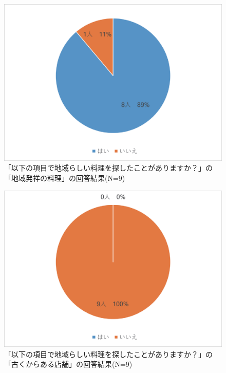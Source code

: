 \documentclass{funthesis}
\begin{document}
\begin{figure}[tbp]
  \begin{center}
    \includegraphics[clip,width=12cm]{5.4.eps}
    \caption[「以下の項目で地域らしい料理を探したことがありますか？」の「地域発祥の料理」の回答結果]{「以下の項目で地域らしい料理を探したことがありますか？」の「地域発祥の料理」の回答結果(N=9)}
  \end{center}
\end{figure}

\begin{figure}[tbp]
  \begin{center}
    \includegraphics[clip,width=12cm]{5.5.eps}
    \caption[「以下の項目で地域らしい料理を探したことがありますか？」の「古くからある店舗」の回答結果]{「以下の項目で地域らしい料理を探したことがありますか？」の「古くからある店舗」の回答結果(N=9)}
  \end{center}
\end{figure}
\end{document}
